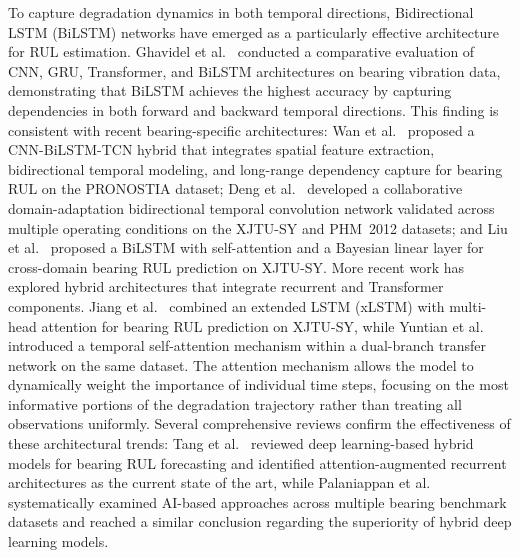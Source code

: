 To capture degradation dynamics in both temporal directions,
Bidirectional LSTM (BiLSTM) networks have emerged as a particularly
effective architecture for RUL estimation.
Ghavidel et al.~\cite{ghavidel_remaining_2026} conducted a
comparative evaluation of CNN, GRU, Transformer, and BiLSTM
architectures on bearing vibration data, demonstrating that BiLSTM
achieves the highest accuracy by capturing dependencies in both
forward and backward temporal directions. This finding is consistent
with recent bearing-specific architectures:
Wan et al.~\cite{wan_robust_2026} proposed a CNN-BiLSTM-TCN hybrid
that integrates spatial feature extraction, bidirectional temporal
modeling, and long-range dependency capture for bearing RUL on the
PRONOSTIA dataset;
Deng et al.~\cite{DENG2026112193} developed a collaborative
domain-adaptation bidirectional temporal convolution network validated
across multiple operating conditions on the XJTU-SY and PHM~2012
datasets; and
Liu et al.~\cite{liu_deep_2026} proposed a BiLSTM with self-attention
and a Bayesian linear layer for cross-domain bearing RUL prediction on
XJTU-SY. More recent work has explored
hybrid architectures that integrate recurrent and Transformer
components. Jiang et al.~\cite{s26051578} combined an extended LSTM
(xLSTM) with multi-head attention for bearing RUL prediction on
XJTU-SY, while
Yuntian et al.~\cite{YONGXING2026104313} introduced a temporal
self-attention mechanism within a dual-branch transfer network on the
same dataset. The attention mechanism
allows the model to dynamically weight the importance of individual
time steps, focusing on the most informative portions of the
degradation trajectory rather than treating all observations
uniformly. Several comprehensive reviews confirm the effectiveness
of these architectural trends: Tang et al.~\cite{tang_deep_2025}
reviewed deep learning-based hybrid models for bearing RUL
forecasting and identified attention-augmented recurrent architectures
as the current state of the art, while
Palaniappan et al.~\cite{palaniappan_systematic_2026} systematically
examined AI-based approaches across multiple bearing benchmark datasets
and reached a similar conclusion regarding the superiority of hybrid
deep learning models.\\

